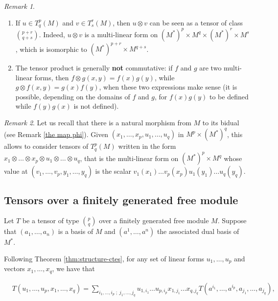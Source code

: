 \documentclass{report}
\theoremstyle{definition}
\theoremstyle{remark}
\newtheorem{remark}{Remark}
\begin{document}
\begin{remark}
\begin{enumerate}
    \item 


If $u\in T^p_q(M)$ and $v \in T^r_s(M)$, then $u\otimes v$ can be seen as a tensor of class ${p+r\choose q + s}$. Indeed, $u \otimes v$ is a multi-linear form on $(M^*)^p \times M^q \times (M^*)^r \times M^s$, which is isomorphic to $(M^*)^{p+r} \times M^{q + s}$. 
        \item
The tensor product is generally \textbf{not} commutative: if $f$ and $g$ are two multi-linear forms, then $f\otimes g (x,y) = f(x)g(y)$, while $g\otimes f (x,y) = g(x)f(y)$, when these two expressions make sense (it is possible, depending on the domains of $f$ and $g$, for $f(x)g(y)$ to be defined while $f(y)g(x)$ is not defined).
\end{enumerate}
\end{remark}

\begin{remark} \label{pour j}
    Let us recall that there is a natural morphism from $M$ to its bidual (see Remark \ref{the map phi}). Given $(x_1,  \dots , x_p,u_1,\dots,u_q) $ in  $M^p \times (M^*)^q$, this allows to consider tensors of $T^p_q(M)$ written in the form $x_1 \otimes\dots \otimes x_p \otimes u_1 \otimes \dots \otimes u_q $, that is the multi-linear form on $(M^*)^p \times M^q$ whose value at $(v_1,  \dots , v_p,y_1,\dots,y_q) $ is the scalar $v_1(x_1) \dots v_p(x_p)u_1(y_1)\dots u_q(y_q)$.
\end{remark} 
 
    
\bigskip
\subsection{Tensors over a finitely generated free module}
Let $T$ be a tensor of type ${p \choose q}$ over a finitely generated free module $M$. Suppose that $(a_1,\dots,a_n)$ is a basis of $M$ and $(a^1,\dots,a^n)$ the associated dual basis of $M^*$. 

Following Theorem \ref{thm:structure-ctes}, for any set of linear forms $u_1,\dots,u_p$ and vectors $x_1,\dots,x_q$, we have that  
 
\begin{equation*} \label{gen}
        \begin{split}
                & T(u_1,\dots,u_p,x_1,\dots,x_q) 
                 = \sum_{i_1,\dots,i_p\;;\;j_1,\dots,j_q} u_{1,i_1}\dots u_{p,i_p}x_{1,j_1}\dots x_{q,j_q} T(a^{i_1},\dots,a^{i_p},a_{j_1},\dots,a_{j_q}),
                \end{split}
\end{equation*}
\end{document}
